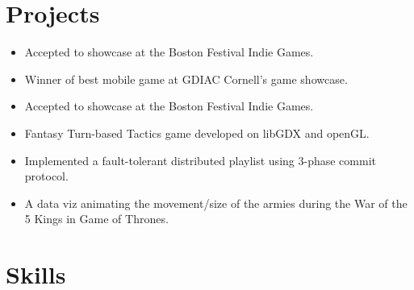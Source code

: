\documentclass[10pt,letterpaper,sans]{moderncv}        %
\begin{document}
\section{Projects}
\begin{itemize}%
\item Accepted to showcase at the Boston Festival Indie Games.
\item Winner of best mobile game at GDIAC Cornell's game showcase.
\end{itemize}
\begin{itemize}%
\item Accepted to showcase at the Boston Festival Indie Games.
\item Fantasy Turn-based Tactics game developed on libGDX and openGL.
\end{itemize}
\begin{itemize}
\item Implemented a fault-tolerant distributed playlist using 3-phase commit protocol.
\end{itemize}
\begin{itemize}
\item A data viz animating the movement/size of the armies during the War of the 5 Kings in Game of Thrones.
\end{itemize}

\section{Skills}


\end{document}
